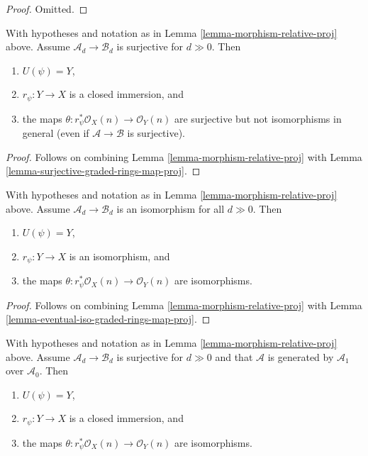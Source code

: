\begin{proof}
Omitted.
\end{proof}

\begin{lemma}
\label{lemma-surjective-graded-rings-map-relative-proj}
With hypotheses and notation as in Lemma \ref{lemma-morphism-relative-proj}
above. Assume $\mathcal{A}_d \to \mathcal{B}_d$ is surjective for
$d \gg 0$. Then
\begin{enumerate}
\item $U(\psi) = Y$,
\item $r_\psi : Y \to X$ is a closed immersion, and
\item the maps $\theta : r_\psi^*\mathcal{O}_X(n) \to \mathcal{O}_Y(n)$
are surjective but not isomorphisms in general (even if
$\mathcal{A} \to \mathcal{B}$ is surjective).
\end{enumerate}
\end{lemma}

\begin{proof}
Follows on combining
Lemma \ref{lemma-morphism-relative-proj}
with
Lemma \ref{lemma-surjective-graded-rings-map-proj}.
\end{proof}

\begin{lemma}
\label{lemma-eventual-iso-graded-rings-map-relative-proj}
With hypotheses and notation as in Lemma \ref{lemma-morphism-relative-proj}
above. Assume $\mathcal{A}_d \to \mathcal{B}_d$ is an isomorphism for all
$d \gg 0$. Then
\begin{enumerate}
\item $U(\psi) = Y$,
\item $r_\psi : Y \to X$ is an isomorphism, and
\item the maps $\theta : r_\psi^*\mathcal{O}_X(n) \to \mathcal{O}_Y(n)$
are isomorphisms.
\end{enumerate}
\end{lemma}

\begin{proof}
Follows on combining
Lemma \ref{lemma-morphism-relative-proj}
with
Lemma \ref{lemma-eventual-iso-graded-rings-map-proj}.
\end{proof}

\begin{lemma}
\label{lemma-surjective-generated-degree-1-map-relative-proj}
With hypotheses and notation as in Lemma \ref{lemma-morphism-relative-proj}
above. Assume $\mathcal{A}_d \to \mathcal{B}_d$ is surjective for $d \gg 0$
and that $\mathcal{A}$ is generated by $\mathcal{A}_1$ over $\mathcal{A}_0$.
Then
\begin{enumerate}
\item $U(\psi) = Y$,
\item $r_\psi : Y \to X$ is a closed immersion, and
\item the maps $\theta : r_\psi^*\mathcal{O}_X(n) \to \mathcal{O}_Y(n)$
are isomorphisms.
\end{enumerate}
\end{lemma}

